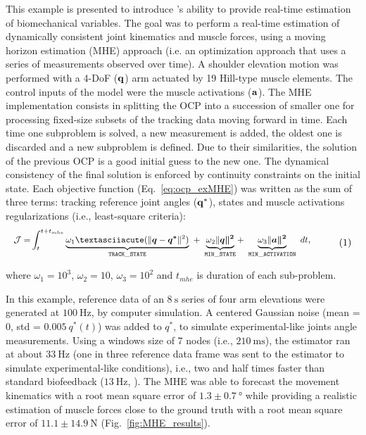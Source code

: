 This example is presented to introduce \bioptim's ability to provide real-time estimation of biomechanical variables.
The goal was to perform a real-time estimation of dynamically consistent joint kinematics and muscle forces, using a moving horizon estimation (MHE) approach (i.e. an optimization approach that uses a series of measurements observed over time). 
A shoulder elevation motion was performed with a 4-DoF ($\bf{q}$) arm actuated by 19 Hill-type muscle elements.
The control inputs of the model were the muscle activations ($\bf{a}$).
The MHE implementation consists in splitting the OCP into a succession of smaller one for processing fixed-size subsets of the tracking data moving forward in time. 
Each time one subproblem is solved, a new measurement is added, the oldest one is discarded and a new subproblem is defined. 
Due to their similarities, the solution of the previous OCP is a good initial guess to the new one. 
The dynamical consistency of the final solution is enforced by continuity constraints on the initial state. 
Each objective function (Eq.~\ref{eq:ocp_exMHE}) was written as the sum of three terms: tracking reference joint angles ($\bf{q^*}$), states and muscle activations regularizations (i.e., least-square criteria): 
\\ 
\[ 
\resizebox{0.9\columnwidth}{!}{$ 
\begin{aligned}
\mathcal{J} = &\int_t^{t+t_{mhe}}\underbrace{\omega_1´(\|\boldsymbol{q} - \boldsymbol{q^*}\|^{2})}_{\mathtt{TRACK\_STATE}}~ 
+ ~ \underbrace{\omega_2\|\boldsymbol{q\|^2}}_{\mathtt{MIN\_STATE}} 
+ ~ \underbrace{\omega_3\|\boldsymbol{a\|^2}}_{\mathtt{MIN\_ACTIVATION}}~dt, 
\end{aligned}   
$}  
\addtag  
\label{eq:ocp_exMHE}  
\]  

\noindent where $\omega_1 =10^3$, $\omega_2 = 10$, $\omega_3 = 10^2$ and $t_{mhe}$ is duration of each sub-problem. 

In this example, reference data of an $\SI{8}{\second}$ series of four arm elevations were generated at $\SI{100}{\Hz}$, by computer simulation.
A centered Gaussian noise (mean = 0, std = $0.005\:q^*(t)$) was added to $q^*$, to simulate experimental-like joints angle measurements.
Using a windows size of 7 nodes (i.e., $\SI{210}{\milli\second}$), the estimator ran at about $\SI{33}{\Hz}$ (one in three reference data frame was sent to the estimator to simulate experimental-like conditions), i.e., two and half times faster than standard biofeedback ($\SI{13}{\Hz}$, \cite{kannape2013self}).
The MHE was able to forecast the movement kinematics with a root mean square error of $1.3\pm\SI{0.7}{\degree}$ while providing a realistic estimation of muscle forces close to the ground truth with a root mean square error of $11.1\pm\SI{14.9}{\newton}$ (Fig.~\ref{fig:MHE_results}).


